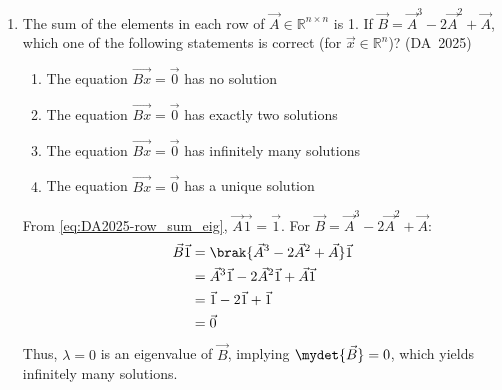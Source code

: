 \begin{enumerate}[label=\thesubsection.\arabic*, ref=\thesubsection.\theenumi]
\solution
From \eqref{eq:DA2025-back_sub}:
\begin{align}
	x_i &= \frac{1}{U_{ii}}\brak{b_i - \sum_{j=i+1}^n U_{ij} x_j}
\end{align}
For each row $i$ ($1 \le i \le n$), the back-substitution step requires:
\begin{itemize}
	\item Multiplications: $n - i$
	\item Additions/Subtractions: $n - i$
	\item Divisions: $1$
\end{itemize}
Summing these operations across all $n$ rows:
\begin{align}
	\text{Multiplications} &= \sum_{i=1}^n \brak{n - i} = \frac{n\brak{n-1}}{2}
	\\
	\text{Additions} &= \sum_{i=1}^n \brak{n - i} = \frac{n\brak{n-1}}{2}
	\\
	\text{Divisions} &= \sum_{i=1}^n 1 = n
\end{align}
The total sum of all arithmetic operations evaluates to:
\begin{align}
	\text{Total Operations} &= \frac{n\brak{n-1}}{2} + \frac{n\brak{n-1}}{2} + n = n^2
	\\
	&= O\brak{n^2}
\end{align}
	\item 
	The sum of the elements in each row of $\vec{A} \in \mathbb{R}^{n \times n}$ is 1. If $\vec{B} = \vec{A}^3 - 2\vec{A}^2 + \vec{A}$, which one of the following statements is correct (for $\vec{x} \in \mathbb{R}^n$)?
	\hfill (DA~2025)
	\begin{enumerate}
		\item The equation $\vec{Bx} = \vec{0}$ has no solution
		\item The equation $\vec{Bx} = \vec{0}$ has exactly two solutions
		\item The equation $\vec{Bx} = \vec{0}$ has infinitely many solutions
		\item The equation $\vec{Bx} = \vec{0}$ has a unique solution
	\end{enumerate}
	\solution
	From \eqref{eq:DA2025-row_sum_eig}, $\vec{A}\vec{1} = \vec{1}$. For $\vec{B} = \vec{A}^3 - 2\vec{A}^2 + \vec{A}$:
	\begin{align}
		\vec{B}\vec{1} &= \brak{\vec{A}^3 - 2\vec{A}^2 + \vec{A}}\vec{1}
		\\
		&= \vec{A}^3\vec{1} - 2\vec{A}^2\vec{1} + \vec{A}\vec{1}
		\\
		&= \vec{1} - 2\vec{1} + \vec{1}
		\\
		&= \vec{0}
	\end{align}
	Thus, $\lambda = 0$ is an eigenvalue of $\vec{B}$, implying $\mydet{\vec{B}} = 0$, which yields infinitely many solutions.
	

\end{enumerate}
